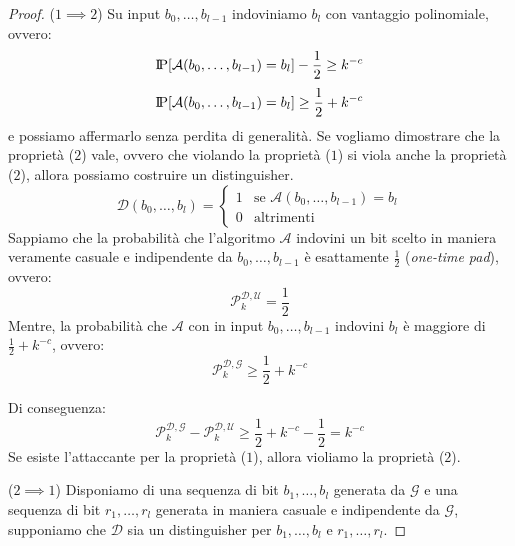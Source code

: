 \begin{proof}
  ($1 \implies 2$) Su input $b_0, \dots, b_{l - 1}$ indoviniamo $b_l$ con vantaggio polinomiale,
  ovvero:
  \[
    \text{I\kern-0.15em P}[\mathcal{A}(b_0, \dots, b_{l-1}) = b_l] - \frac{1}{2} \geq k^{-c}
  \]
  \[
    \text{I\kern-0.15em P}[\mathcal{A}(b_0, \dots, b_{l-1}) = b_l] \geq \frac{1}{2} + k^{-c}
  \]
  e possiamo affermarlo senza perdita di generalità. Se vogliamo dimostrare che la proprietà 
  ($2$) vale, ovvero che violando la proprietà ($1$) si viola anche la proprietà ($2$), 
  allora possiamo costruire un distinguisher.
  \[
    \mathcal{D}(b_0, \dots, b_l) = \begin{cases}
      1 & \text{se } \mathcal{A}(b_0, \dots, b_{l-1}) = b_l \\
      0 & \text{altrimenti}
      \end{cases}
  \]
  Sappiamo che la probabilità che l'algoritmo $\mathcal{A}$ indovini 
  un bit scelto in maniera veramente casuale e indipendente da $b_0, \dots, b_{l - 1}$ 
  è esattamente $\frac{1}{2}$ (\textit{one-time pad}), ovvero:
  \[\mathcal{P}_k^{\mathcal{D},\mathcal{U}} = \frac{1}{2}\]
  Mentre, la probabilità che $\mathcal{A}$ con in input $b_0, \dots, b_{l - 1}$ indovini
  $b_l$ è maggiore di $\frac{1}{2} + k^{-c}$, ovvero:
  \[\mathcal{P}_k^{\mathcal{D},\mathcal{G}} \geq \frac{1}{2} + k^{-c}\]

  Di conseguenza:
  \[
    \mathcal{P}_k^{\mathcal{D},\mathcal{G}} - \mathcal{P}_k^{\mathcal{D},\mathcal{U}} \geq \frac{1}{2} + k^{-c} - \frac{1}{2} = k^{-c}
  \]
  Se esiste l'attaccante per la proprietà ($1$), allora violiamo la proprietà ($2$).

  ($2 \implies 1$) Disponiamo di una sequenza di bit $b_1, \dots, b_l$ generata da $\mathcal{G}$ e 
  una sequenza di bit $r_1, \dots, r_l$ generata in maniera casuale e indipendente da $\mathcal{G}$, supponiamo 
  che $\mathcal{D}$ sia un distinguisher per $b_1, \dots, b_l$ e $r_1, \dots, r_l$.
  

\end{proof}
